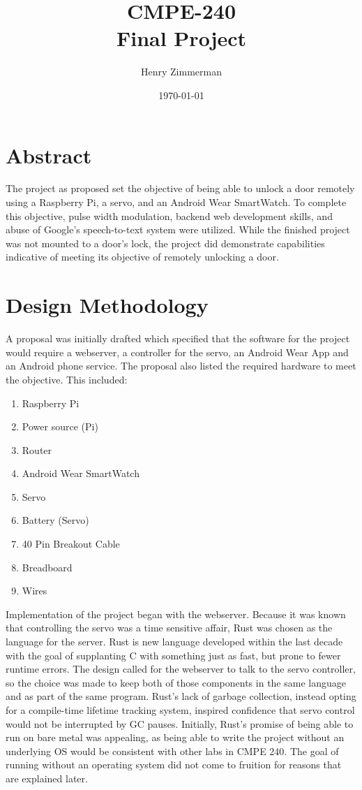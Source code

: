 \documentclass[a4paper]{article}
\begin{document}
\title{CMPE-240 \\ Final Project}
\date{\today}
\author{Henry Zimmerman}
\maketitle



\section{Abstract}\label{sec:abstract}
The project as proposed set the objective of being able to unlock a door remotely using a Raspberry Pi, a servo, and an Android Wear SmartWatch.
To complete this objective, pulse width modulation, backend web development skills, and abuse of Google's speech-to-text system were utilized.
While the finished project was not mounted to a door's lock, the project did demonstrate capabilities indicative of meeting its objective of remotely unlocking a door.

\section{Design Methodology}\label{sec:designMethodology}

A proposal was initially drafted which specified that the software for the project would require a webserver, a controller for the servo, an Android Wear App and an Android phone service.
The proposal also listed the required hardware to meet the objective.
This included:
\begin{enumerate}
    \item Raspberry Pi
    \item Power source (Pi)
    \item Router
    \item Android Wear SmartWatch
    \item Servo
    \item Battery (Servo)
    \item 40 Pin Breakout Cable
    \item Breadboard
    \item Wires
\end{enumerate}

Implementation of the project began with the webserver.
Because it was known that controlling the servo was a time sensitive affair, Rust was chosen as the language for the server.
Rust is new language developed within the last decade with the goal of supplanting C with something just as fast, but prone to fewer runtime errors.
The design called for the webserver to talk to the servo controller, so the choice was made to keep both of those components in the same language and as part of the same program.
Rust's lack of garbage collection, instead opting for a compile-time lifetime tracking system, inspired confidence that servo control would not be interrupted by GC pauses.
Initially, Rust's promise of being able to run on bare metal was appealing, as being able to write the project without an underlying OS would be consistent with other labs in CMPE 240.
The goal of running without an operating system did not come to fruition for reasons that are explained later.
\end{document}
